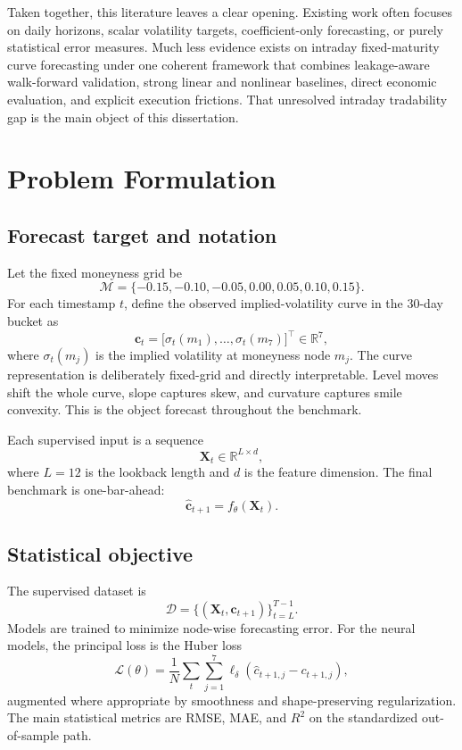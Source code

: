 \documentclass[12pt]{report}
\begin{document}
Taken together, this literature leaves a clear opening. Existing work often focuses on daily horizons, scalar volatility targets, coefficient-only forecasting, or purely statistical error measures. Much less evidence exists on intraday fixed-maturity curve forecasting under one coherent framework that combines leakage-aware walk-forward validation, strong linear and nonlinear baselines, direct economic evaluation, and explicit execution frictions. That unresolved intraday tradability gap is the main object of this dissertation.

\chapter{Problem Formulation}

\section{Forecast target and notation}
Let the fixed moneyness grid be
\[
\mathcal{M}=\{-0.15,-0.10,-0.05,0.00,0.05,0.10,0.15\}.
\]
For each timestamp \(t\), define the observed implied-volatility curve in the 30-day bucket as
\[
\mathbf{c}_t=\big[\sigma_t(m_1),\ldots,\sigma_t(m_7)\big]^\top \in \mathbb{R}^7,
\]
where \(\sigma_t(m_j)\) is the implied volatility at moneyness node \(m_j\). The curve representation is deliberately fixed-grid and directly interpretable. Level moves shift the whole curve, slope captures skew, and curvature captures smile convexity. This is the object forecast throughout the benchmark.

Each supervised input is a sequence
\[
\mathbf{X}_t \in \mathbb{R}^{L\times d},
\]
where \(L=12\) is the lookback length and \(d\) is the feature dimension. The final benchmark is one-bar-ahead:
\[
\hat{\mathbf{c}}_{t+1}=f_\theta(\mathbf{X}_t).
\]

\section{Statistical objective}
The supervised dataset is
\[
\mathcal{D}=\{(\mathbf{X}_t,\mathbf{c}_{t+1})\}_{t=L}^{T-1}.
\]
Models are trained to minimize node-wise forecasting error. For the neural models, the principal loss is the Huber loss
\[
\mathcal{L}(\theta)=\frac{1}{N}\sum_t\sum_{j=1}^{7}\ell_\delta\!\left(\hat{c}_{t+1,j}-c_{t+1,j}\right),
\]
augmented where appropriate by smoothness and shape-preserving regularization. The main statistical metrics are RMSE, MAE, and \(R^2\) on the standardized out-of-sample path.
\end{document}
